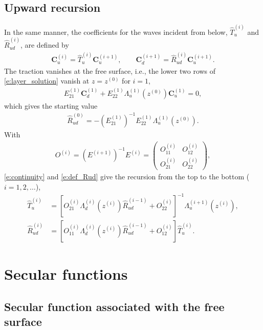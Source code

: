 \documentclass[a4paper, 10pt]{article}
\begin{document}
\subsection{Upward recursion}

In the same manner, the coefficients for the waves incident from below, $\hat{T}_u^{(i)}$ and $\hat{R}_{ud}^{(i)}$, are defined by
\begin{align}
  \symbf{C}_u^{(i)} = \hat{T}_u^{(i)} \symbf{C}_u^{(i + 1)}, \qquad
  \symbf{C}_d^{(i + 1)} = \hat{R}_{ud}^{(i)} \symbf{C}_u^{(i + 1)}.
  \label{e:def_Rud}
\end{align}
The traction vanishes at the free surface, i.e., the lower two rows of \eqref{e:layer_solution} vanish at $z = z^{(0)}$ for $i = 1$,
\begin{align}
  E_{21}^{(1)} \symbf{C}_d^{(1)} + E_{22}^{(1)} \Lambda_u^{(1)}(z^{(0)}) \symbf{C}_u^{(1)} = 0,
  \label{e:free_surface}
\end{align}
which gives the starting value
\begin{align}
  \hat{R}_{ud}^{(0)} = -\left( E_{21}^{(1)} \right)^{-1} E_{22}^{(1)} \Lambda_u^{(1)}(z^{(0)}).
\end{align}
With
\begin{align}
  O^{(i)} = \left( E^{(i + 1)} \right)^{-1} E^{(i)} =
  \begin{pmatrix}
    O_{11}^{(i)} & O_{12}^{(i)} \\
    O_{21}^{(i)} & O_{22}^{(i)}
  \end{pmatrix},
\end{align}
\eqref{e:continuity} and \eqref{e:def_Rud} give the recursion from the top to the bottom ($i = 1, 2, \dots$),
\begin{align}
  \hat{T}_u^{(i)} &=
  \left[ O_{21}^{(i)} \Lambda_d^{(i)}(z^{(i)}) \hat{R}_{ud}^{(i - 1)} + O_{22}^{(i)} \right]^{-1}
  \Lambda_u^{(i + 1)}(z^{(i)}),
  \\
  \hat{R}_{ud}^{(i)} &=
  \left[ O_{11}^{(i)} \Lambda_d^{(i)}(z^{(i)}) \hat{R}_{ud}^{(i - 1)} + O_{12}^{(i)} \right]
  \hat{T}_u^{(i)}.
\end{align}

\section{Secular functions}

\subsection{Secular function associated with the free surface}
\end{document}
